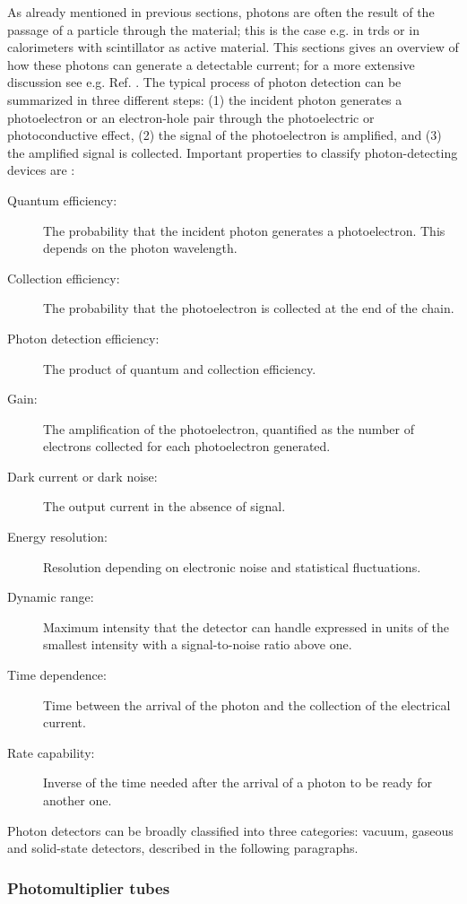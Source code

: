 As already mentioned in previous sections, photons are often the result of the passage of a particle through the material; 
this is the case e.g. in \glspl{trd} or in calorimeters with scintillator as active material. 
This sections gives an overview of how these photons can generate a detectable current; for a more extensive discussion see e.g. Ref. \cite{lightdetection,Grupen:2012zpa}. The typical process of photon detection can be summarized in three different steps: (1) the incident photon generates a photoelectron or an electron-hole pair through the photoelectric or photoconductive effect, (2) the signal of the photoelectron is  
amplified, and (3) the amplified signal is collected. Important properties to classify photon-detecting devices are \cite{Patrignani:2016xqp}:
\begin{description}
\item[Quantum efficiency:] The probability that the incident photon generates a photoelectron. This depends on the photon wavelength.
\item[Collection efficiency:] The probability that the photoelectron is collected at the end of the chain.
\item[Photon detection efficiency:] The product of quantum and collection efficiency.
\item[Gain:] The amplification of the photoelectron, quantified as the number of electrons collected for each photoelectron generated.
\item[Dark current or dark noise:] The output current in the absence of signal.
\item[Energy resolution:] Resolution depending on electronic noise and statistical fluctuations.
\item[Dynamic range:] Maximum intensity that the detector can handle expressed in units of the smallest intensity with a signal-to-noise ratio above one.
\item[Time dependence:] Time between the arrival of the photon and the collection of the electrical current.
\item[Rate capability:] Inverse of the time needed after the arrival of a photon to be ready for another one.
\end{description}

Photon detectors can be broadly classified into three categories: vacuum, gaseous and solid-state detectors, described in the following paragraphs.

\subsubsection*{Photomultiplier tubes}  


